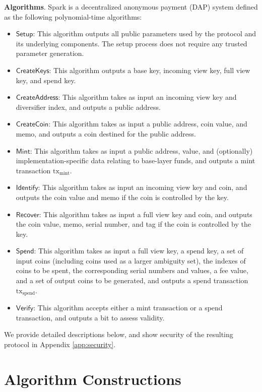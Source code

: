 \documentclass{llncs}
\newcommand{\func}[1]{\mathsf{#1}}
\begin{document}
\textbf{Algorithms}. Spark is a decentralized anonymous payment (DAP) system defined as the following polynomial-time algorithms:
\begin{itemize}
\item $\func{Setup}$: This algorithm outputs all public parameters used by the protocol and its underlying components.
The setup process does not require any trusted parameter generation.
\item $\func{CreateKeys}$: This algorithm outputs a base key, incoming view key, full view key, and spend key.
\item $\func{CreateAddress}$: This algorithm takes as input an incoming view key and diversifier index, and outputs a public address.
\item $\func{CreateCoin}$: This algorithm takes as input a public address, coin value, and memo, and outputs a coin destined for the public address.
\item $\func{Mint}$: This algorithm takes as input a public address, value, and (optionally) implementation-specific data relating to base-layer funds, and outputs a mint transaction $\text{tx}_{\text{mint}}$.
\item $\func{Identify}$: This algorithm takes as input an incoming view key and coin, and outputs the coin value and memo if the coin is controlled by the key.
\item $\func{Recover}$: This algorithm takes as input a full view key and coin, and outputs the coin value, memo, serial number, and tag if the coin is controlled by the key.
\item $\func{Spend}$: This algorithm takes as input a full view key, a spend key, a set of input coins (including coins used as a larger ambiguity set), the indexes of coins to be spent, the corresponding serial numbers and values, a fee value, and a set of output coins to be generated, and outputs a spend transaction $\text{tx}_{\text{spend}}$.
\item $\func{Verify}$: This algorithm accepts either a mint transaction or a spend transaction, and outputs a bit to assess validity.
\end{itemize}

We provide detailed descriptions below, and show security of the resulting protocol in Appendix \ref{app:security}.


\section{Algorithm Constructions}
\end{document}

